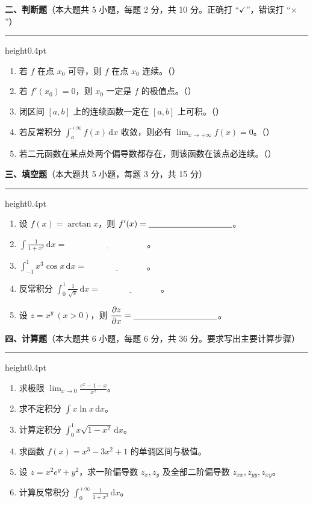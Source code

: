 \documentclass[12pt]{ctexart}
\newcommand{\bigsection}[2]{%
  \vspace{6pt}%
  {\noindent\bfseries\large #1}\hfill{\normalsize（本大题共 #2）}\par
  \vspace{2pt}\hrule height0.4pt\vspace{8pt}}
\newcommand{\blank}[1][3cm]{\underline{\hspace{#1}}}
\theoremstyle{definition}
\begin{document}
\bigsection{二、判断题}{5 小题，每题 2 分，共 10 分。正确打 “$\checkmark$”，错误打 “$\times$”}

\begin{enumerate}[label=\arabic*.]
\item 若 $f$ 在点 $x_{0}$ 可导，则 $f$ 在点 $x_{0}$ 连续。\hfill（\qquad）
\item 若 $f'(x_{0})=0$，则 $x_{0}$ 一定是 $f$ 的极值点。\hfill（\qquad）
\item 闭区间 $[a,b]$ 上的连续函数一定在 $[a,b]$ 上可积。\hfill（\qquad）
\item 若反常积分 $\displaystyle\int_{a}^{+\infty}f(x)\,\mathrm{d}x$ 收敛，则必有 $\displaystyle\lim_{x\to+\infty}f(x)=0$。\hfill（\qquad）
\item 若二元函数在某点处两个偏导数都存在，则该函数在该点必连续。\hfill（\qquad）
\end{enumerate}

\bigsection{三、填空题}{5 小题，每题 3 分，共 15 分}

\begin{enumerate}[label=\arabic*.]
\item 设 $f(x)=\arctan x$，则 $f'(x)=\blank[3.5cm]$。
\item $\displaystyle\int \frac{1}{1+x^{2}}\,\mathrm{d}x=\blank[4cm]$。
\item $\displaystyle\int_{-1}^{1} x^{3}\cos x\,\mathrm{d}x=\blank[3cm]$。
\item 反常积分 $\displaystyle\int_{0}^{1}\frac{1}{\sqrt{x}}\,\mathrm{d}x=\blank[3cm]$。
\item 设 $z=x^{y}\ (x>0)$，则 $\dfrac{\partial z}{\partial x}=\blank[3.5cm]$。
\end{enumerate}

\bigsection{四、计算题}{6 小题，每题 6 分，共 36 分。要求写出主要计算步骤}

\begin{enumerate}[label=\arabic*.]
\item 求极限 $\displaystyle\lim_{x\to 0}\frac{e^{x}-1-x}{x^{2}}$。

\item 求不定积分 $\displaystyle\int x\ln x\,\mathrm{d}x$。

\item 计算定积分 $\displaystyle\int_{0}^{1} x\sqrt{1-x^{2}}\,\mathrm{d}x$。

\item 求函数 $f(x)=x^{3}-3x^{2}+1$ 的单调区间与极值。

\item 设 $z=x^{2}e^{y}+y^{2}$，求一阶偏导数 $z_{x},z_{y}$ 及全部二阶偏导数
  $z_{xx},z_{yy},z_{xy}$。

\item 计算反常积分 $\displaystyle\int_{0}^{+\infty}\frac{1}{1+x^{2}}\,\mathrm{d}x$。
\end{enumerate}
\end{document}
